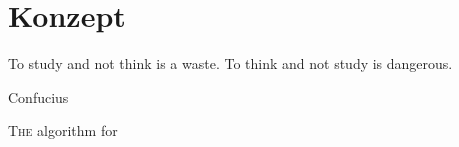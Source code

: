 
\chapter{Konzept}
\label{chapter:konzept}
\setlength{\epigraphwidth}{7.0cm}
\epigraph{To study and not think is a waste. To think and not study is dangerous.}{Confucius}

\ifpdf
    \graphicspath{{5_konzept/figures/PNG/}{5_konzept/figures/PDF/}{5_konzept/figures/}}
\else
    \graphicspath{{5_konzept/figures/EPS/}{5_konzept/figures/}}
\fi

\lettrine{T}{he} algorithm for

\newpage\thispagestyle{empty}
